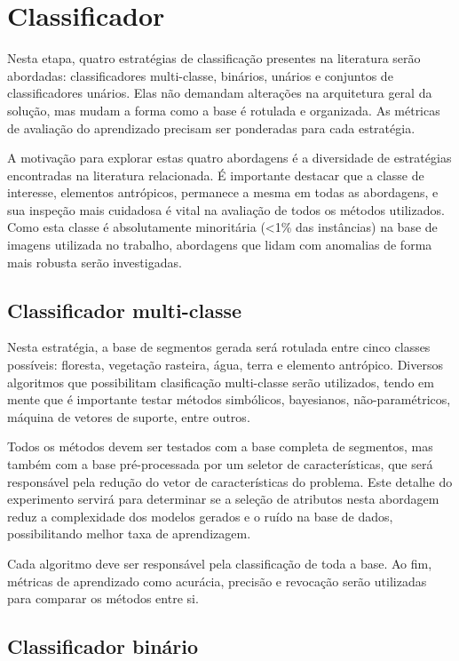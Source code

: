 \section{Classificador}\label{sec:metClassificador}

Nesta etapa, quatro estratégias de classificação presentes na literatura serão abordadas: classificadores multi-classe, binários, unários e conjuntos de classificadores unários. Elas não demandam alterações na arquitetura geral da solução, mas mudam a forma como a base é rotulada e organizada. As métricas de avaliação do aprendizado precisam ser ponderadas para cada estratégia.

A motivação para explorar estas quatro abordagens é a diversidade de estratégias encontradas na literatura relacionada. É importante destacar que a classe de interesse, elementos antrópicos, permanece a mesma em todas as abordagens, e sua inspeção mais cuidadosa é vital na avaliação de todos os métodos utilizados. Como esta classe é absolutamente minoritária (<1\% das instâncias) na base de imagens utilizada no trabalho, abordagens que lidam com anomalias de forma mais robusta serão investigadas.

\subsection{Classificador multi-classe}

Nesta estratégia, a base de segmentos gerada será rotulada entre cinco classes possíveis: floresta, vegetação rasteira, água, terra e elemento antrópico. Diversos algoritmos que possibilitam clasificação multi-classe serão utilizados, tendo em mente que é importante testar métodos simbólicos, bayesianos, não-paramétricos, máquina de vetores de suporte, entre outros.

Todos os métodos devem ser testados com a base completa de segmentos, mas também com a base pré-processada por um seletor de características, que será responsável pela redução do vetor de características do problema. Este detalhe do experimento servirá para determinar se a seleção de atributos nesta abordagem reduz a complexidade dos modelos gerados e o ruído na base de dados, possibilitando melhor taxa de aprendizagem.

Cada algoritmo deve ser responsável pela classificação de toda a base. Ao fim, métricas de aprendizado como acurácia, precisão e revocação serão utilizadas para comparar os métodos entre si.

\subsection{Classificador binário}

